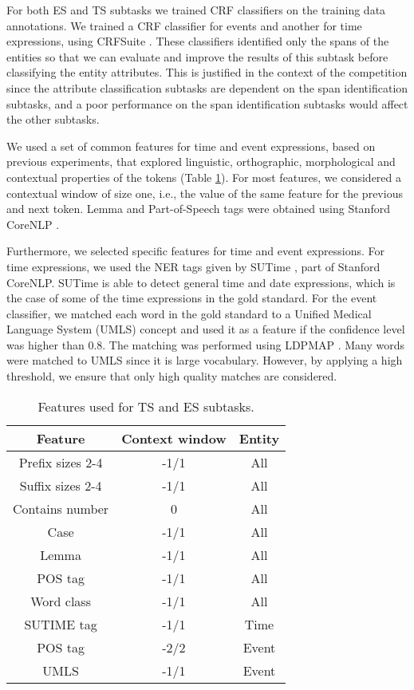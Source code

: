 \documentclass[11pt,a4paper]{article}
\begin{document}
For both ES and TS subtasks we trained CRF classifiers on the training data annotations.
We trained a CRF classifier for events and another for time expressions, using CRFSuite \cite{CRFsuite}.
These classifiers identified only the spans of the entities so that we can evaluate and improve the results of this subtask before classifying the entity attributes.
This is justified in the context of the competition since the attribute classification subtasks are dependent on the span identification subtasks, and a poor performance on the span identification subtasks would affect the other subtasks.

We used a set of common features for time and event expressions, based on previous experiments, that explored linguistic, orthographic, morphological and contextual properties of the tokens (Table \ref{table:features}).
For most features, we considered a contextual window of size one, i.e., the value of the same feature for the previous and next token.
Lemma and Part-of-Speech tags were obtained using Stanford CoreNLP \cite{Manning2014}.

Furthermore, we selected specific features for time and event expressions.
For time expressions, we used the NER tags given by SUTime \cite{Chang2012}, part of Stanford CoreNLP.
SUTime is able to detect general time and date expressions, which is the case of some of the time expressions in the gold standard.
For the event classifier, we matched each word in the gold standard to a Unified Medical Language System (UMLS) concept and used it as a feature if the confidence level was higher than 0.8.
The matching was performed using LDPMAP \cite{Ren2014}.
Many words were matched to UMLS since it is large vocabulary.
However, by applying a high threshold, we ensure that only high quality matches are considered.

\begin{table}
\centering
\begin{tabular}{|c|c|c|}
\hline
Feature & Context window & Entity\\ 
\hline
Prefix sizes 2-4 & -1/1 & All\\ 
\hline
Suffix sizes 2-4 & -1/1 & All\\ 
\hline
Contains number & 0 & All\\ 
\hline
Case & -1/1 & All\\ 
\hline
Lemma & -1/1 & All\\ 
\hline
POS tag & -1/1 & All\\ 
\hline
Word class & -1/1 & All\\ 
\hline
SUTIME tag & -1/1 & Time\\ 
\hline
POS tag & -2/2 & Event\\ 
\hline
UMLS & -1/1 & Event\\ 
\hline\end{tabular}
\caption{Features used for TS and ES subtasks.} 
\label{table:features}
\end{table}
\end{document}

